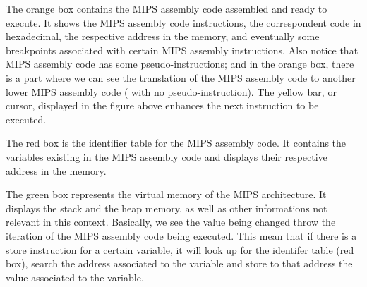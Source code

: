 \documentclass[
  oneside,
  11pt, a4paper,
  footinclude=true,
  headinclude=true,
  cleardoublepage=empty
]{scrbook}
\begin{document}
The orange box contains the MIPS assembly code assembled and ready to execute. It shows the MIPS assembly code instructions, the correspondent code in hexadecimal, the respective address in the memory, and eventually some breakpoints associated with certain MIPS assembly instructions. Also notice that MIPS assembly code has some pseudo-instructions; and in the orange box, there is a part where we can see the translation of the MIPS assembly code to another lower MIPS assembly code ( with no pseudo-instruction).
The yellow bar, or cursor, displayed in the figure above enhances the next instruction to be executed.

The red box is the identifier table for the MIPS assembly code. It contains the variables existing in the MIPS assembly code and displays their respective address in the memory.

The green box represents the virtual memory of the MIPS architecture. It displays the stack and the heap memory, as well as other informations not relevant in this context. Basically, we see the value being changed throw the iteration of the MIPS assembly code being executed. This mean that if there is a store instruction for a certain variable, it will look up for the identifer table (red box), search the address associated to the variable and store to that address the value associated to the variable.


\newpage

\end{document}
